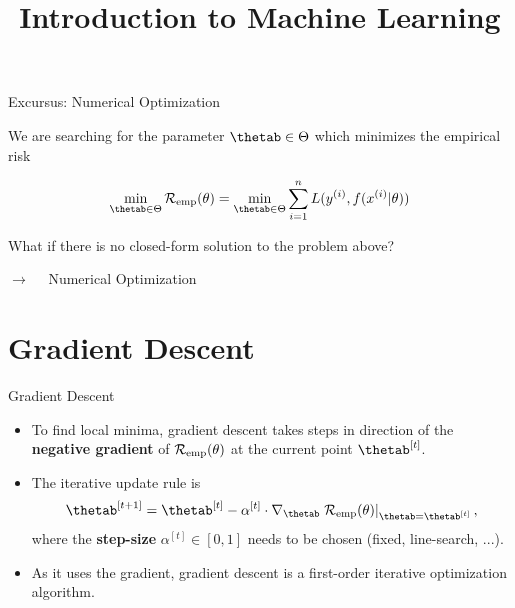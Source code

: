 




\newcommand{\titlefigure}{figure_man/optimization_steps.jpeg}
\newcommand{\learninggoals}{
\item Understand that an ML model is simply a parametrized curve
\item Understand that the hypothesis space lists all admissible models
    for a learner
\item Understand the relationship between the hypothesis space and the parameter space
}

\title{Introduction to Machine Learning}
\date{}



\begin{vbframe}{Excursus: Numerical Optimization}

We are searching for the parameter $\thetab \in \Theta$ which minimizes the empirical risk

\begin{eqnarray*}
\min_{\thetab \in \Theta} \risket = \min_{\thetab \in \Theta} \sumin \Lxyit \cr 
\end{eqnarray*}

What if there is no closed-form solution to the problem above? 

\lz 

$\longrightarrow\quad$ Numerical Optimization

\end{vbframe}


\section{Gradient Descent}


\begin{vbframe}{Gradient Descent}

\begin{itemize}
\item To find local minima, gradient descent takes steps in direction of the \textbf{negative gradient} of $\mathcal{R}_{\text{emp}}(\theta)$ at the current point $\thetab^{[t]}$.
\item The iterative update rule is 
$$
  \thetab^{[t + 1]} = \thetab^{[t]} - \alpha^{[t]} \cdot \nabla_{\thetab} \left.\risket\right|_{\thetab = \thetab^{[t]}} ,
$$
where the \textbf{step-size} $\alpha^{[t]}  \in [0,1]$ needs to be chosen (fixed, line-search, ...).
\item As it uses the gradient, gradient descent is a first-order iterative optimization algorithm.
\end{itemize}

\end{vbframe}
  
